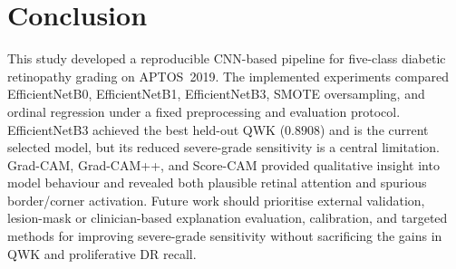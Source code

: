 \documentclass[11pt,a4paper]{article}
\begin{document}
\section{Conclusion}
This study developed a reproducible CNN-based pipeline for five-class diabetic retinopathy grading on APTOS~2019. The implemented experiments compared EfficientNetB0, EfficientNetB1, EfficientNetB3, SMOTE oversampling, and ordinal regression under a fixed preprocessing and evaluation protocol. EfficientNetB3 achieved the best held-out QWK (\(0.8908\)) and is the current selected model, but its reduced severe-grade sensitivity is a central limitation. Grad-CAM, Grad-CAM++, and Score-CAM provided qualitative insight into model behaviour and revealed both plausible retinal attention and spurious border/corner activation. Future work should prioritise external validation, lesion-mask or clinician-based explanation evaluation, calibration, and targeted methods for improving severe-grade sensitivity without sacrificing the gains in QWK and proliferative DR recall.
\end{document}
